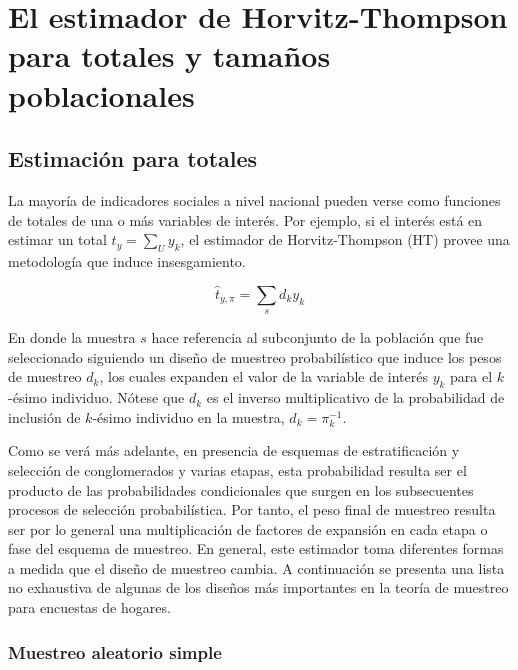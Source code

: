\documentclass[
  12pt,
]{book}
\begin{document}
\hypertarget{el-estimador-de-horvitz-thompson-para-totales-y-tamauxf1os-poblacionales}{%
\section{El estimador de Horvitz-Thompson para totales y tamaños poblacionales}\label{el-estimador-de-horvitz-thompson-para-totales-y-tamauxf1os-poblacionales}}

\hypertarget{estimaciuxf3n-para-totales}{%
\subsection{Estimación para totales}\label{estimaciuxf3n-para-totales}}

La mayoría de indicadores sociales a nivel nacional pueden verse como funciones de totales de una o más variables de interés. Por ejemplo, si el interés está en estimar un total \(t_y=\sum_U y_k\), el estimador de Horvitz-Thompson (HT) provee una metodología que induce insesgamiento.

\[
\hat{t}_{y, \pi} = \sum_s d_k y_k
\]

En donde la muestra \(s\) hace referencia al subconjunto de la población que fue seleccionado siguiendo un diseño de muestreo probabilístico que induce los pesos de muestreo \(d_k\), los cuales expanden el valor de la variable de interés \(y_k\) para el \(k\)-ésimo individuo. Nótese que \(d_k\) es el inverso multiplicativo de la probabilidad de inclusión de \(k\)-ésimo individuo en la muestra, \(d_k = \pi_k^{-1}\).

Como se verá más adelante, en presencia de esquemas de estratificación y selección de conglomerados y varias etapas, esta probabilidad resulta ser el producto de las probabilidades condicionales que surgen en los subsecuentes procesos de selección probabilística. Por tanto, el peso final de muestreo resulta ser por lo general una multiplicación de factores de expansión en cada etapa o fase del esquema de muestreo. En general, este estimador toma diferentes formas a medida que el diseño de muestreo cambia. A continuación se presenta una lista no exhaustiva de algunas de los diseños más importantes en la teoría de muestreo para encuestas de hogares.

\hypertarget{muestreo-aleatorio-simple-1}{%
\subsubsection{Muestreo aleatorio simple}\label{muestreo-aleatorio-simple-1}}
\end{document}
